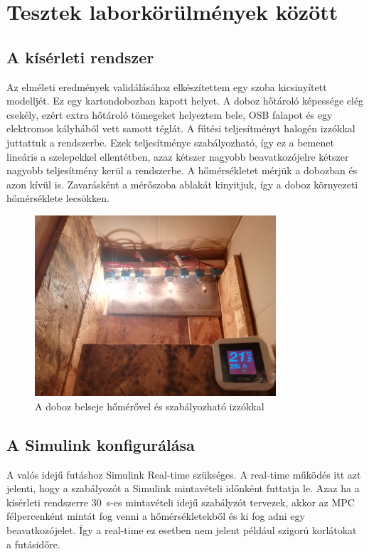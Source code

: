\chapter{Tesztek laborkörülmények között}

\section{A kísérleti rendszer}
Az elméleti eredmények validálásához elkészítettem egy szoba kicsinyített modelljét. Ez egy kartondobozban kapott helyet. A doboz hőtároló képessége elég csekély, ezért extra hőtároló tömegeket helyeztem bele, OSB falapot és egy elektromos kályhából vett samott téglát.
A fűtési teljesítményt halogén izzókkal juttattuk a rendszerbe. Ezek teljesítménye szabályozható, így ez a bemenet lineáris a szelepekkel ellentétben, azaz kétszer nagyobb beavatkozójelre kétszer nagyobb teljesítmény kerül a rendszerbe.
A hőmérsékletet mérjük a dobozban és azon kívül is. Zavarásként a mérőszoba ablakát kinyitjuk, így a doboz környezeti hőmérséklete lecsökken.

\begin{figure}[H]
	\centering
	\includegraphics[width=0.8\textwidth]{figures/realsys/interior2}
	\caption{A doboz belseje hőmérővel és szabályozható izzókkal}
	\label{fig:realsys-interior}
\end{figure}

\section{A Simulink konfigurálása}
A valós idejű futáshoz Simulink  Real-time szükséges. A real-time működés itt azt jelenti, hogy a szabályozót a Simulink mintavételi időnként futtatja le. Azaz ha a kísérleti rendszerre \SI{30}{\second}-es mintavételi idejű szabályzót tervezek, akkor az MPC félpercenként mintát fog venni a hőmérsékletekből és ki fog adni egy beavatkozójelet. Így a real-time ez esetben nem jelent például szigorú korlátokat a futásidőre.



